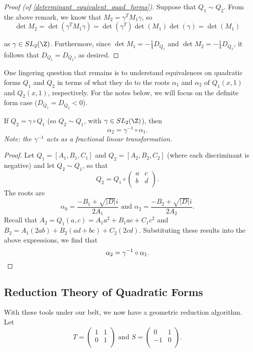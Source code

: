 \documentclass[11pt]{article}
\begin{document}
\begin{proof}[Proof (of \cref{determinant_equivalent_quad_forms})]
Suppose that $Q_1 \sim Q_2$. From the above remark, we know that $M_2 = \gamma^T M_1 \gamma$, so
\[
    \det M_2 = \det(\gamma^T M_1 \gamma) = \det(\gamma^T) \det(M_1) \det(\gamma) = \det(M_1)
\]

as $\gamma \in SL_2(\Z)$. Furthermore, since $\det M_1 = -\frac{1}{4}D_{Q_1}$ and $\det M_2 = -\frac{1}{4}D_{Q_2}$,
it follows that $D_{Q_1} = D_{Q_2}$, as desired.
\end{proof}

One lingering question that remains is to understand equivalences on quadratic forms $Q_1$ and $Q_2$ in terms of 
what they do to the roots $\alpha_{1}$ and $\alpha_2$ of $Q_1(x, 1)$ and $Q_2(x, 1)$, respectively. For the notes below, we will
focus on the definite form case ($D_{Q_1} = D_{Q_2} < 0$). \\

\begin{theorem}
If $Q_2 = \gamma \circ Q_1$ (so $Q_2 \sim Q_1$, with $\gamma \in SL_2(\Z)$), then 
\[
    \alpha_2 = \gamma^{-1} \circ \alpha_1.
\]
\textit{Note: the $\gamma^{-1}$ acts as a fractional linear transformation.}
\end{theorem}

\begin{proof}
Let $Q_1 = [A_1, B_1, C_1]$ and $Q_2 = [A_2, B_2, C_2]$ (where each discriminant is negative) and let $Q_2 \sim Q_1$, so that
\[
    Q_2 = Q_1 \circ \begin{pmatrix}
        a & c \\
        b & d \\
    \end{pmatrix}.
\]
The roots are 
\[
\alpha_0 = \frac{-B_1 + \sqrt{|D|}i}{2A_1} \text{ and } \alpha_2 = \frac{-B_2 + \sqrt{|D|}i}{2A_{2}}.
\]
Recall that $A_2 = Q_1(a, c) = A_1a^2 + B_1ac + C_1c^2$ and $B_2 = A_1(2ab) + B_2(ad + bc) + C_2(2cd)$. 
Substituting these results into the above expressions, we find that
\[
\alpha_2 = \gamma^{-1} \circ \alpha_1. \qedhere
\]
\end{proof}

\subsection{Reduction Theory of Quadratic Forms}
With these tools under our belt, we now have a geometric reduction algorithm. \\

Let 
\[ T = \begin{pmatrix}
    1 & 1  \\
    0 & 1  \\
\end{pmatrix} \text{ and } 
S = \begin{pmatrix}
    0 & 1  \\
    -1 & 0  \\
\end{pmatrix}.\]
\end{document}
